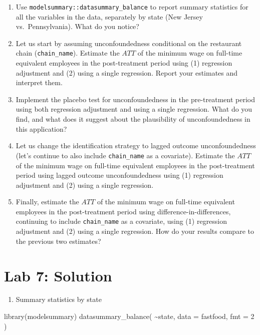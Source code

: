 \documentclass[
  letterpaper,
  DIV=11,
  numbers=noendperiod]{scrreprt}
\newenvironment{Shaded}{\begin{snugshade}}{\end{snugshade}}
\newcommand{\AttributeTok}[1]{\textcolor[rgb]{0.40,0.45,0.13}{#1}}
\newcommand{\DecValTok}[1]{\textcolor[rgb]{0.68,0.00,0.00}{#1}}
\newcommand{\FunctionTok}[1]{\textcolor[rgb]{0.28,0.35,0.67}{#1}}
\newcommand{\NormalTok}[1]{\textcolor[rgb]{0.00,0.23,0.31}{#1}}
\newcommand{\SpecialCharTok}[1]{\textcolor[rgb]{0.37,0.37,0.37}{#1}}
\providecommand{\tightlist}{%
  \setlength{\itemsep}{0pt}\setlength{\parskip}{0pt}}\usepackage{longtable,booktabs,array}
\begin{document}
\begin{enumerate}
\def\labelenumi{\arabic{enumi}.}
\item
  Use \texttt{modelsummary::datasummary\_balance} to report summary
  statistics for all the variables in the data, separately by state (New
  Jersey vs.~Pennsylvania). What do you notice?
\item
  Let us start by assuming unconfoundedness conditional on the
  restaurant chain (\texttt{chain\_name}). Estimate the \(ATT\) of the
  minimum wage on full-time equivalent employees in the post-treatment
  period using (1) regression adjustment and (2) using a single
  regression. Report your estimates and interpret them.
\item
  Implement the placebo test for unconfoundedness in the pre-treatment
  period using both regression adjustment and using a single regression.
  What do you find, and what does it suggest about the plausibility of
  unconfoundedness in this application?
\item
  Let us change the identification strategy to lagged outcome
  unconfoundedness (let's continue to also include \texttt{chain\_name}
  as a covariate). Estimate the \(ATT\) of the minimum wage on full-time
  equivalent employees in the post-treatment period using lagged outcome
  unconfoundedness using (1) regression adjustment and (2) using a
  single regression.
\item
  Finally, estimate the \(ATT\) of the minimum wage on full-time
  equivalent employees in the post-treatment period using
  difference-in-differences, continuing to include \texttt{chain\_name}
  as a covariate, using (1) regression adjustment and (2) using a single
  regression. How do your results compare to the previous two estimates?
\end{enumerate}

\section{Lab 7: Solution}\label{lab-7-solution}

\begin{enumerate}
\def\labelenumi{\arabic{enumi}.}
\tightlist
\item
  Summary statistics by state
\end{enumerate}

\begin{Shaded}
\begin{Highlighting}[]
\FunctionTok{library}\NormalTok{(modelsummary)}
\FunctionTok{datasummary\_balance}\NormalTok{(}
    \SpecialCharTok{\textasciitilde{}}\NormalTok{state,}
    \AttributeTok{data =}\NormalTok{ fastfood,}
    \AttributeTok{fmt =} \DecValTok{2}
\NormalTok{)}
\end{Highlighting}
\end{Shaded}
\end{document}
